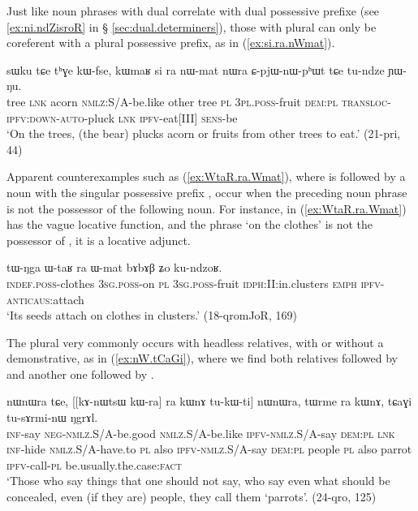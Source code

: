 Just like noun phrases with dual  correlate with dual possessive prefixe (see \ref{ex:ni.ndZisroR} in § \ref{sec:dual.determiners}), those with plural  can only be coreferent with a plural possessive prefix, as  in (\ref{ex:si.ra.nWmat}).

\begin{exe}
\ex \label{ex:si.ra.nWmat}
 \gll  sɯku tɕe tʰɣe kɯ-fse, kɯmaʁ si ra nɯ-mat nɯra ɕ-pjɯ-nɯ-pʰɯt tɕe tu-ndze ɲɯ-ŋu.\\
tree \textsc{lnk} acorn \textsc{nmlz}:S/A-be.like other tree \textsc{pl} \textsc{3pl}.\textsc{poss}-fruit \textsc{dem}:\textsc{pl} \textsc{transloc}-\textsc{ipfv}:\textsc{down}-\textsc{auto}-pluck \textsc{lnk} \textsc{ipfv}-eat[III] \textsc{sens}-be \\
\glt `On the trees, (the bear) plucks acorn or fruits from other trees to eat.' (21-pri, 44)
\end{exe}

Apparent counterexamples such as (\ref{ex:WtaR.ra.Wmat}), where  is followed by a noun with the singular possessive prefix , occur when the preceding noun phrase is not the possessor of the following noun. For instance, in (\ref{ex:WtaR.ra.Wmat})  has the vague locative function, and the phrase  `on the clothes' is not the possessor of , it is a locative adjunct.

\begin{exe}
\ex \label{ex:WtaR.ra.Wmat}
 \gll tɯ-ŋga ɯ-taʁ ra ɯ-mat bɤbɤβ ʑo ku-ndzoʁ. \\
 \textsc{indef}.\textsc{poss}-clothes \textsc{3sg}.\textsc{poss}-on \textsc{pl} \textsc{3sg}.\textsc{poss}-fruit \textsc{idph}:II:in.clusters \textsc{emph} \textsc{ipfv}-\textsc{anticaus}:attach \\
\glt `Its seeds attach on clothes in clusters.' (18-qromJoR, 169)
\end{exe}

The plural  very commonly occurs with headless relatives, with or without a demonstrative, as in (\ref{ex:nW.tCaGi}), where we find both relatives followed by  and another one followed by .

\begin{exe}
\ex \label{ex:nW.tCaGi}
\gll [kɤ-ti mɤ-kɯ-pe kɯ-fse tu-kɯ-ti] nɯnɯra tɕe, [[kɤ-nɯtsɯ kɯ-ra] ra kɯnɤ tu-kɯ-ti] nɯnɯra, 
tɯrme ra kɯnɤ, tɕaɣi tu-sɤrmi-nɯ ŋgrɤl.  \\
\textsc{inf}-say \textsc{neg}-\textsc{nmlz}.S/A-be.good \textsc{nmlz}.S/A-be.like \textsc{ipfv}-\textsc{nmlz}.S/A-say \textsc{dem}:\textsc{pl} \textsc{lnk} \textsc{inf}-hide \textsc{nmlz}.S/A-have.to \textsc{pl} also \textsc{ipfv}-\textsc{nmlz}.S/A-say \textsc{dem}:\textsc{pl} people \textsc{pl} also  parrot \textsc{ipfv}-call-\textsc{pl} be.usually.the.case:\textsc{fact} \\
\glt `Those who say things that one should not say, who say even what should be concealed, even (if they are) people, they call them `parrots'. (24-qro, 125)
\end{exe} 

